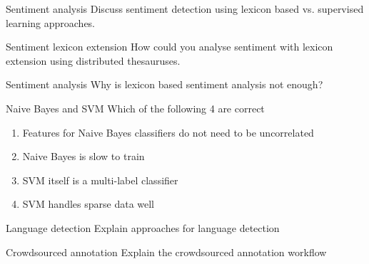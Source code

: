 \documentclass{article}
\begin{document}
\begin{exercise}{Sentiment analysis}
  Discuss sentiment detection using lexicon based vs. supervised learning approaches.

  \begin{solution}
  \end{solution}
\end{exercise}

\begin{exercise}{Sentiment lexicon extension}
  How could you analyse sentiment with lexicon extension using distributed thesauruses.

  \begin{solution}
  \end{solution}
\end{exercise}

\begin{exercise}{Sentiment analysis}
  Why is lexicon based sentiment analysis not enough?

  \begin{solution}
  \end{solution}
\end{exercise}

\begin{exercise}{Naive Bayes and SVM}
  Which of the following 4 are correct
  \begin{enumerate}
    \item Features for Naive Bayes classifiers do not need to be uncorrelated
    \item Naive Bayes is slow to train
    \item SVM itself is a multi-label classifier
    \item SVM handles sparse data well
  \end{enumerate}

  \begin{solution}
  \end{solution}
\end{exercise}

\begin{exercise}{Language detection}
  Explain approaches for language detection

  \begin{solution}
  \end{solution}
\end{exercise}

\begin{exercise}{Crowdsourced annotation}
  Explain the crowdsourced annotation workflow

  \begin{solution}
  \end{solution}
\end{exercise}
\end{document}
